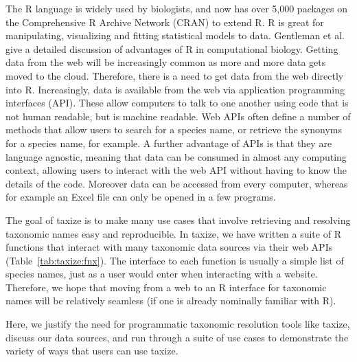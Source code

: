 \begin{sloppypar}
The R language is widely used by biologists, and now has over 5,000 packages on the Comprehensive R Archive Network (CRAN) to extend R. 
R is great for manipulating, visualizing and fitting statistical models to data. 
Gentleman et al. \citet{gentleman_bioconductor:_2004} give a detailed discussion of advantages of R in computational biology. Getting data from the web will be increasingly common as more and more data gets moved to the cloud. 
Therefore, there is a need to get data from the web directly into R. 
Increasingly, data is available from the web via application programming interfaces (API). 
These allow computers to talk to one another using code that is not human readable, but is machine readable. 
Web APIs often define a number of methods that allow users to search for a species name, or retrieve the synonyms for a species name, for example. 
A further advantage of APIs is that they are language agnostic, meaning that data can be consumed in almost any computing context, allowing users to interact with the web API without having to know the details of the code. 
Moreover data can be accessed from every computer, whereas for example an Excel file can only be opened in a few programs. 

The goal of taxize is to make many use cases that involve retrieving and resolving taxonomic names easy and reproducible. 
In taxize, we have written a suite of R functions that interact with many taxonomic data sources via their web APIs (Table~\ref{tab:taxize:fnx}). 
The interface to each function is usually a simple list of species names, just as a user would enter when interacting with a website. 
Therefore, we hope that moving from a web to an R interface for taxonomic names will be relatively seamless (if one is already nominally familiar with R). 

Here, we justify the need for programmatic taxonomic resolution tools like taxize, discuss our data sources, and run through a suite of use cases to demonstrate the variety of ways that users can use taxize.

\clearpage


\end{sloppypar}
